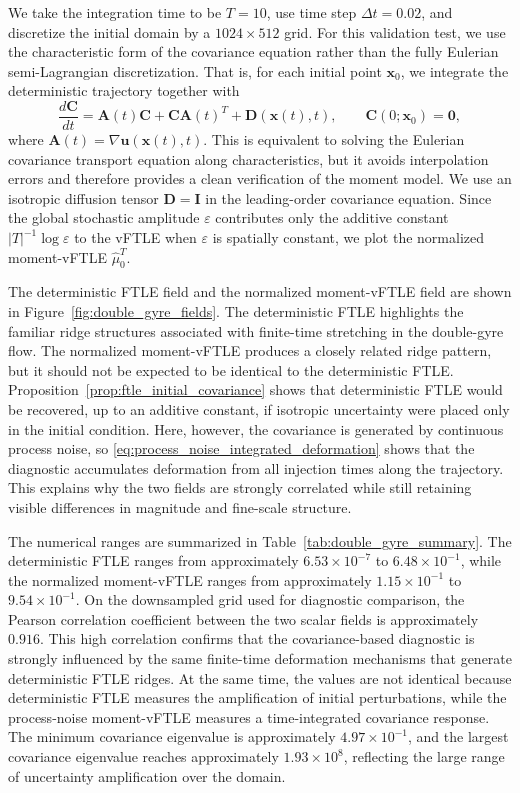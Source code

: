 \documentclass[a4paper,11pt]{article}
\numberwithin{equation}{section}
\theoremstyle{plain}
\theoremstyle{definition}
\theoremstyle{remark}
\newcommand{\bx}{\mathbf{x}}
\newcommand{\bu}{\mathbf{u}}
\newcommand{\bA}{\mathbf{A}}
\newcommand{\bC}{\mathbf{C}}
\newcommand{\bD}{\mathbf{D}}
\newcommand{\bI}{\mathbf{I}}
\newcommand{\bzero}{\mathbf{0}}
\begin{document}
We take the integration time to be \(T=10\), use time step \(\Delta t=0.02\), and discretize the initial domain by a \(1024\times512\) grid.  For this validation test, we use the characteristic form of the covariance equation rather than the fully Eulerian semi-Lagrangian discretization.  That is, for each initial point \(\bx_0\), we integrate the deterministic trajectory together with
\[
    \frac{d\bC}{dt}
    =
    \bA(t)\bC+\bC\bA(t)^T+\bD(\bx(t),t),
    \qquad
    \bC(0;\bx_0)=\bzero,
\]
where \(\bA(t)=\nabla\bu(\bx(t),t)\).  This is equivalent to solving the Eulerian covariance transport equation along characteristics, but it avoids interpolation errors and therefore provides a clean verification of the moment model.  We use an isotropic diffusion tensor \(\bD=\bI\) in the leading-order covariance equation.  Since the global stochastic amplitude \(\varepsilon\) contributes only the additive constant \(|T|^{-1}\log\varepsilon\) to the vFTLE when \(\varepsilon\) is spatially constant, we plot the normalized moment-vFTLE \(\widehat{\mu}_0^T\).

The deterministic FTLE field and the normalized moment-vFTLE field are shown in Figure~\ref{fig:double_gyre_fields}.  The deterministic FTLE highlights the familiar ridge structures associated with finite-time stretching in the double-gyre flow.  The normalized moment-vFTLE produces a closely related ridge pattern, but it should not be expected to be identical to the deterministic FTLE.  Proposition~\ref{prop:ftle_initial_covariance} shows that deterministic FTLE would be recovered, up to an additive constant, if isotropic uncertainty were placed only in the initial condition.  Here, however, the covariance is generated by continuous process noise, so \eqref{eq:process_noise_integrated_deformation} shows that the diagnostic accumulates deformation from all injection times along the trajectory.  This explains why the two fields are strongly correlated while still retaining visible differences in magnitude and fine-scale structure.

The numerical ranges are summarized in Table~\ref{tab:double_gyre_summary}.  The deterministic FTLE ranges from approximately \(6.53\times10^{-7}\) to \(6.48\times10^{-1}\), while the normalized moment-vFTLE ranges from approximately \(1.15\times10^{-1}\) to \(9.54\times10^{-1}\).  On the downsampled grid used for diagnostic comparison, the Pearson correlation coefficient between the two scalar fields is approximately \(0.916\).  This high correlation confirms that the covariance-based diagnostic is strongly influenced by the same finite-time deformation mechanisms that generate deterministic FTLE ridges.  At the same time, the values are not identical because deterministic FTLE measures the amplification of initial perturbations, while the process-noise moment-vFTLE measures a time-integrated covariance response.  The minimum covariance eigenvalue is approximately \(4.97\times10^{-1}\), and the largest covariance eigenvalue reaches approximately \(1.93\times10^8\), reflecting the large range of uncertainty amplification over the domain.
\end{document}
